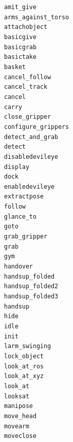 \documentclass[compress]{beamer}
\begin{document}
{{\begin{frame}{}
\begin{multicols}{4}
{\tt amit\_give} \\
{\tt arms\_against\_torso} \\
{\tt attachobject} \\
{\tt basicgive} \\
{\tt basicgrab} \\
{\tt basictake} \\
{\tt basket} \\
{\tt cancel\_follow} \\
{\tt cancel\_track} \\
{\tt cancel} \\
{\tt carry} \\
{\tt close\_gripper} \\
{\tt configure\_grippers} \\
{\tt detect\_and\_grab} \\
{\tt detect} \\
{\tt disabledevileye} \\
{\tt display} \\
{\tt dock} \\
{\tt enabledevileye} \\
{\tt extractpose} \\
{\tt follow} \\
{\tt glance\_to} \\
{\tt goto} \\
{\tt grab\_gripper} \\
{\tt grab} \\
{\tt gym} \\
{\tt handover} \\
{\tt handsup\_folded} \\
{\tt handsup\_folded2} \\
{\tt handsup\_folded3} \\
{\tt handsup} \\
{\tt hide} \\
{\tt idle} \\
{\tt init} \\
{\tt larm\_swinging} \\
{\tt lock\_object} \\
{\tt look\_at\_ros} \\
{\tt look\_at\_xyz} \\
{\tt look\_at} \\
{\tt looksat} \\
{\tt manipose} \\
{\tt move\_head} \\
{\tt movearm} \\
{\tt moveclose} \\

\end{multicols}
\end{frame}}}
\end{document}
